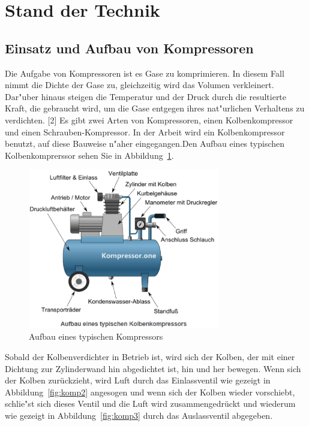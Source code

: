 \section{Stand der Technik}
\subsection{Einsatz und Aufbau von Kompressoren}
Die Aufgabe von Kompressoren ist es Gase zu komprimieren.
In diesem Fall nimmt die Dichte der Gase zu, gleichzeitig wird das
Volumen verkleinert.
Dar"uber hinaus steigen die Temperatur und der Druck durch die resultierte
Kraft, die gebraucht wird, um die Gase entgegen ihres nat"urlichen
Verhaltens zu verdichten. [2] 
Es gibt zwei Arten von Kompressoren, einen Kolbenkompressor
und einen Schrauben-Kompressor. 
In der Arbeit wird ein Kolbenkompressor benutzt,
auf diese Bauweise n"aher eingegangen.Den Aufbau eines typischen
Kolbenkomprerssor sehen Sie in Abbildung~\ref{fig:komp1}.

\begin{figure}[!htb]
\begin{center}
\includegraphics[height=7cm]{bilder/Kompressor.eps}
\end{center}
\caption{Aufbau eines typischen Kompressors}\label{fig:komp1}
\end{figure}

Sobald der Kolbenverdichter in Betrieb ist,
wird sich der Kolben,
der mit einer Dichtung zur Zylinderwand hin abgedichtet ist, 
hin und her bewegen. 
Wenn sich der Kolben zurückzieht, 
wird Luft durch das Einlassventil wie gezeigt in Abbildung~\ref{fig:komp2} angesogen 
und wenn sich der Kolben wieder vorschiebt, 
schlie"st sich dieses Ventil  
 und die Luft wird zusammengedrückt 
und wiederum wie gezeigt in Abbildung~\ref{fig:komp3} durch das Auslassventil abgegeben.


